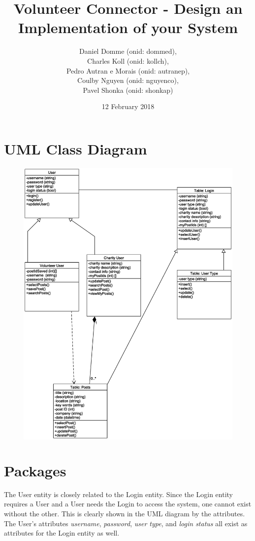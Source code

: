 \documentclass[12pt]{article}
\title{Volunteer Connector - Design an Implementation of your System}
\author{Daniel Domme (onid: dommed), \\
Charles Koll (onid: kollch), \\
Pedro Autran e Morais (onid: autranep), \\
Coulby Nguyen (onid: nguyenco), \\
Pavel Shonka (onid: shonkap)
}
\date{12 February 2018}
\begin{document}
\maketitle
\tableofcontents

\pagebreak
\section{UML Class Diagram}
\begin{figure}[h!]
\includegraphics[width=\textwidth]{classdiagram2}
\end{figure}
\pagebreak
\section{Packages}
The User entity is closely related to the Login entity. Since the Login entity requires a
User and a User needs the Login to access the system, one cannot exist without the other.
This is clearly shown in the UML diagram by the attributes. The User's attributes
\textit{username}, \textit{password}, \textit{user type}, and \textit{login status} all
exist as attributes for the Login entity as well.
\end{document}
